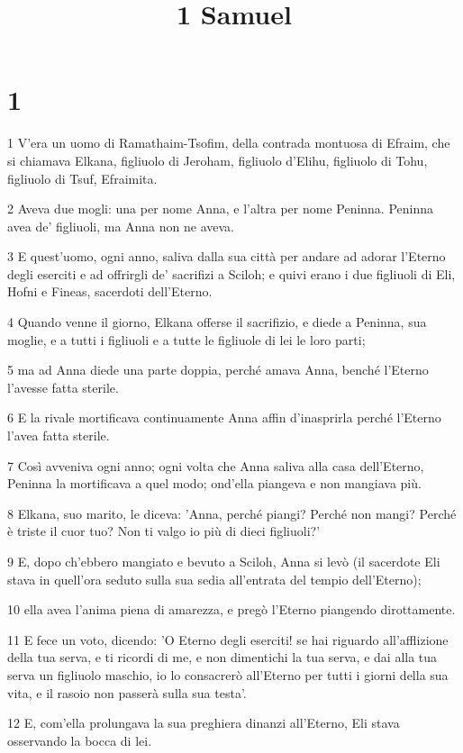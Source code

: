 

\title{1 Samuel}


\chapter{1}

\par 1 V'era un uomo di Ramathaim-Tsofim, della contrada montuosa di Efraim, che si chiamava Elkana, figliuolo di Jeroham, figliuolo d'Elihu, figliuolo di Tohu, figliuolo di Tsuf, Efraimita.
\par 2 Aveva due mogli: una per nome Anna, e l'altra per nome Peninna. Peninna avea de' figliuoli, ma Anna non ne aveva.
\par 3 E quest'uomo, ogni anno, saliva dalla sua città per andare ad adorar l'Eterno degli eserciti e ad offrirgli de' sacrifizi a Sciloh; e quivi erano i due figliuoli di Eli, Hofni e Fineas, sacerdoti dell'Eterno.
\par 4 Quando venne il giorno, Elkana offerse il sacrifizio, e diede a Peninna, sua moglie, e a tutti i figliuoli e a tutte le figliuole di lei le loro parti;
\par 5 ma ad Anna diede una parte doppia, perché amava Anna, benché l'Eterno l'avesse fatta sterile.
\par 6 E la rivale mortificava continuamente Anna affin d'inasprirla perché l'Eterno l'avea fatta sterile.
\par 7 Così avveniva ogni anno; ogni volta che Anna saliva alla casa dell'Eterno, Peninna la mortificava a quel modo; ond'ella piangeva e non mangiava più.
\par 8 Elkana, suo marito, le diceva: 'Anna, perché piangi? Perché non mangi? Perché è triste il cuor tuo? Non ti valgo io più di dieci figliuoli?'
\par 9 E, dopo ch'ebbero mangiato e bevuto a Sciloh, Anna si levò (il sacerdote Eli stava in quell'ora seduto sulla sua sedia all'entrata del tempio dell'Eterno);
\par 10 ella avea l'anima piena di amarezza, e pregò l'Eterno piangendo dirottamente.
\par 11 E fece un voto, dicendo: 'O Eterno degli eserciti! se hai riguardo all'afflizione della tua serva, e ti ricordi di me, e non dimentichi la tua serva, e dai alla tua serva un figliuolo maschio, io lo consacrerò all'Eterno per tutti i giorni della sua vita, e il rasoio non passerà sulla sua testa'.
\par 12 E, com'ella prolungava la sua preghiera dinanzi all'Eterno, Eli stava osservando la bocca di lei.
